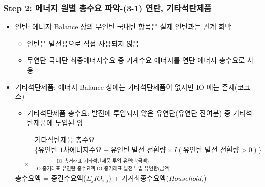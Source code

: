 \documentclass[10pt,compress,slidetop,%
			   hyperref={unicode},xcolor={svgnames},%
			   t]{beamer}
\begin{document}
\begin{frame}
	\frametitle{Step 2: 에너지 원별 총수요 파악-(3-1) 연탄, 기타석탄제품}
	\begin{itemize}
	\item{연탄: 에너지 Balance 상의 무연탄 국내탄 항목은 실제 연탄과는 관계 희박}
		\begin{itemize}
		\item{연탄은 발전용으로 직접 사용되지 않음}
		\item{무연탄 국내탄 최종에너지수요 중 가계수요 에너지를 연탄 에너지 총수요로 사용}	
		\end{itemize}
	\bigskip	
	\item{기타석탄제품: 에너지 Balance 상에는 기타석탄제품이 없지만 IO 에는 존재(코크스)}
	\begin{itemize}		
		\item{기타석탄제품 총수요: 발전에 투입되지 않은 유연탄(유연탄 잔여분) 중 기타석탄제품에 투입된 양 }	
	\end{itemize} 	
\begin{small}
			\begin{eqnarray*}
			& &\mbox{기타석탄제품 총수요}\\ 
			&=&\{\mbox{유연탄 1차에너지수요} -\mbox{유연탄 발전 전환량}\times I(\mbox{유연탄 발전 전환량$>$0})\}\\
			&\times&\frac{\mbox{IO 총거래표 기타석탄제품 투입 유연탄(금액)}}{\mbox{IO 총거래표 유연탄 총수요액-IO 총거래표 발전 투입 유연탄(금액)}} 
			\end{eqnarray*}
			총수요액 = 중간수요액($\Sigma_j IO_{i,j}$) + 가계최종수요액($Household_i$)
\end{small}

	\end{itemize}
	
\end{frame}
\end{document}
